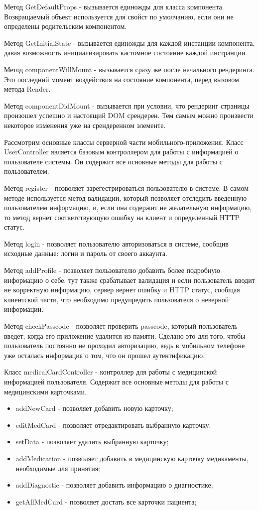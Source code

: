 Метод GetDefaultProps - вызывается единожды для класса компонента. Возвращаемый объект используется для свойст по умолчанию, если они не определены родительским компонентом.

Метод GetInitialState - вызывается единожды для каждой инстанции компонента, давая возможность инициализировать кастомное состояние каждой инстранции.

Метод componentWillMount - вызывается сразу же после начального рендеринга. Это последний момент воздействия на состояние компонента, перед вызовом метода Render.

Метод componentDidMount - вызывается при условии, что рендеринг страницы произошел успешно и настоящий DOM срендерен. Тем самым можно произвести некоторое изменения уже на срендеренном элементе.

Рассмотрим основные классы серверной части мобильного-приложения. Класс UserController является базовым контроллером для работы с информацией о пользователе системы. Он содержит все основные методы для работы с пользователем.

Метод register - позволяет зарегестрироваться пользователю в системе. В самом методе используется метод валидации, который позволяет отследить введенную пользователем информацию, и, если она содержит не желательную информацию, то метод вернет соответствующую ошибку на клиент и определенный HTTP статус.

Метод login - позволяет пользователю авторизоваться в системе, сообщив исходные данные: логин и пароль от своего аккаунта.

Метод addProfile - позволяет пользователю добавить более подробную информацию о себе, тут также срабатывает валидация и если пользователь вводит не корректную информацию, сервер вернет ошибку и HTTP статус, сообщая клиентской части, что необходимо предупредить пользователя о неверной информации.

Метод checkPasscode - позволяет проверить passcode, который пользователь введет, когда его приложение удалится из памяти. Сделано это для того, чтобы пользователь постоянно не проходил авторизацию, ведь в мобильном телефоне уже осталась информация о том, что он прошел аутентификацию.

Класс medicalCardController - контроллер для работы с медицинской информацией пользователя. Содержит все основные методы для работы с медицинскими карточками.

\begin{itemize}
  \item addNewCard - позволяет добавить новую карточку;
  \item editMedCard - позволяет отредактировать выбранную карточку;
  \item setData - позволяет удалить выбранную карточку;
  \item addMedication - позволяет добавить в медицинскую карточку медикаменты, необходимые для принятия;
  \item addDiagnostic - позволяет добавить информацию о диагностике;
  \item getAllMedCard - позволяет достать все карточки пациента;
\end{itemize}

